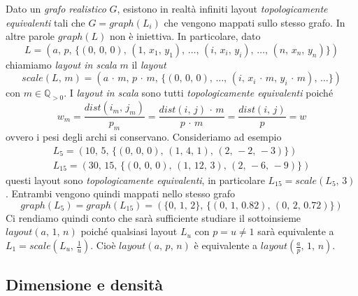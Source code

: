 \documentclass[a4paper,12pt]{article}
\theoremstyle{definition}
\begin{document}
Dato un \emph{grafo realistico} $G$, esistono in realtà infiniti layout \emph{topologicamente equivalenti} tali che $G = graph(L_i)$ che vengono mappati sullo stesso grafo. In altre parole $graph(L)$ non è iniettiva. In particolare, dato
\begin{equation*}
L = (a,\,p,\,\{(0,\,0,\,0),\,(1,\,x_1,\,y_1),\,\dots,\,(i,\,x_i,\,y_i),\,\dots,\,(n,\,x_n,\,y_n)\})
\end{equation*}
chiamiamo \emph{layout in scala} $m$ il \emph{layout}
\begin{equation*}
scale(L,\,m) = (a\,\cdot\,m,\,p\,\cdot\,m,\,\{(0,\,0,\,0),\,\dots,\,(i,\,x_i\,\cdot\,m,\,y_i\,\cdot\,m),\,\dots\})
\end{equation*}
con $m \in \mathbb{Q}_{>0}$. I \emph{layout in scala} sono tutti \emph{topologicamente equivalenti} poiché
\begin{equation*}
w_m = \frac{dist(i_m,\,j_m)}{p_m} = \frac{dist(i,\,j)\,\cdot\,m}{p\,\cdot\,m} = \frac{dist(i,\,j)}{p} = w
\end{equation*}
ovvero i pesi degli archi si conservano. Consideriamo ad esempio
\begin{align*}
L_5 = (10,\,5,\,\{(0,\,0,\,0),\,(1,\,4,\,1),\,(2,\,-2,\,-3)\})\\
L_{15} = (30,\,15,\,\{(0,\,0,\,0),\,(1,\,12,\,3),\,(2,\,-6,\,-9)\})
\end{align*}
questi layout sono \emph{topologicamente equivalenti}, in particolare $L_{15} = scale(L_5,\,3)$. Entrambi vengono quindi mappati nello stesso grafo
\begin{equation*}
graph(L_5) = graph(L_{15}) = (\{0,\,1,\,2\},\,\{(0,\,1,\,0.82),\,(0,\,2,\,0.72)\})
\end{equation*}
Ci rendiamo quindi conto che sarà sufficiente studiare il sottoinsieme $layout(a,\,1,\,n)$ poiché qualsiasi layout $L_u$ con $p=u \neq 1$ sarà equivalente a $L_1 = scale(L_u,\,\frac{1}{u})$. Cioè $layout(a,\,p,\,n)$ è equivalente a $layout(\frac{a}{p},\,1,\,n)$.

\subsection{Dimensione e densità}


\end{document}
